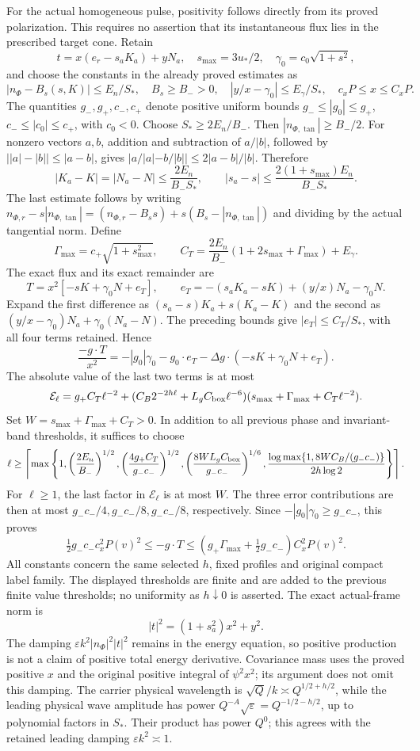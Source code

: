\documentclass[10pt,a4paper]{article}
\begin{document}
For the actual homogeneous pulse, positivity follows directly from its
proved polarization. This requires no assertion that its instantaneous
flux lies in the prescribed target cone. Retain
\[
t=x(e_r-s_aK_a)+yN_a,\quad
s_{\max}=3u_*/2,\quad \gamma_0=c_0\sqrt{1+s^2},
\]
and choose the constants in the already proved estimates as
\[
|n_\Phi-B_s(s,K)|\le E_n/S_*,\quad B_s\ge B_->0,
\quad |y/x-\gamma_0|\le E_\gamma/S_*,\quad c_xP\le x\le C_xP.
\]
The quantities \(g_-,g_+,c_-,c_+\) denote positive uniform bounds
\(g_-\le|g_0|\le g_+\), \(c_-\le|c_0|\le c_+\), with
\(c_0<0\). Choose \(S_*\ge2E_n/B_-\). Then
\(|n_{\Phi,\tan}|\ge B_-/2\). For nonzero vectors \(a,b\),
addition and subtraction of \(a/|b|\), followed by
\(\big||a|-|b|\big|\le|a-b|\), gives
\(|a/|a|-b/|b||\le2|a-b|/|b|\). Therefore
\[
|K_a-K|=|N_a-N|\le\frac{2E_n}{B_-S_*},\qquad
|s_a-s|\le\frac{2(1+s_{\max})E_n}{B_-S_*}.
\]
The last estimate follows by writing
\(n_{\Phi,r}-s|n_{\Phi,\tan}|
=(n_{\Phi,r}-B_ss)+s(B_s-|n_{\Phi,\tan}|)\)
and dividing by the actual tangential norm.
Define
\[
\Gamma_{\max}=c_+\sqrt{1+s_{\max}^2},\qquad
C_T=\frac{2E_n}{B_-}(1+2s_{\max}+\Gamma_{\max})+E_\gamma.
\]
The exact flux and its exact remainder are
\[
T=x^2[-sK+\gamma_0N+e_T],\qquad
e_T=-(s_aK_a-sK)+(y/x)N_a-\gamma_0N.
\]
Expand the first difference as
\((s_a-s)K_a+s(K_a-K)\) and the second as
\((y/x-\gamma_0)N_a+\gamma_0(N_a-N)\).
The preceding bounds give \(|e_T|\le C_T/S_*\), with all four
terms retained. Hence
\[
\frac{-g\cdot T}{x^2}=-|g_0|\gamma_0-g_0\cdot e_T
-\Delta g\cdot(-sK+\gamma_0N+e_T).
\]
The absolute value of the last two terms is at most
\[
\mathcal E_\ell=g_+C_T\ell^{-2}
+(C_B2^{-2h\ell}+L_gC_{\rm box}\ell^{-6})
(s_{\max}+\Gamma_{\max}+C_T\ell^{-2}).
\]
Set \(W=s_{\max}+\Gamma_{\max}+C_T>0\). In addition to all
previous phase and invariant-band thresholds, it suffices to choose
\[
\ell\ge\left\lceil\max\left\{
1,\left(\frac{2E_n}{B_-}\right)^{1/2},
\left(\frac{4g_+C_T}{g_-c_-}\right)^{1/2},
\left(\frac{8WL_gC_{\rm box}}{g_-c_-}\right)^{1/6},
\frac{\log\max\{1,8WC_B/(g_-c_-)\}}{2h\log2}
\right\}\right\rceil.
\]
For \(\ell\ge1\), the last factor in \(\mathcal E_\ell\) is at
most \(W\). The three error contributions are then at most
\(g_-c_-/4,g_-c_-/8,g_-c_-/8\), respectively.
Since \(-|g_0|\gamma_0\ge g_-c_-\), this proves
\[
\tfrac12g_-c_-c_x^2P(v)^2\le-g\cdot T
\le(g_+\Gamma_{\max}+\tfrac12g_-c_-)C_x^2P(v)^2.
\]
All constants concern the same selected \(h\), fixed profiles and
original compact label family. The displayed thresholds are finite and
are added to the previous finite value thresholds; no uniformity as
\(h\downarrow0\) is asserted. The exact actual-frame norm is
\[
|t|^2=(1+s_a^2)x^2+y^2.
\]
The damping \(\varepsilon k^2|n_\Phi|^2|t|^2\) remains in the
energy equation, so positive production is not a claim of positive total
energy derivative. Covariance mass uses the proved positive \(x\) and
the original positive integral of \(\psi^2x^2\); its argument does
not omit this damping. The carrier physical wavelength is \(\sqrt Q/k\asymp Q^{1/2+h/2}\), while the leading physical wave amplitude has power \(Q^{-A}\sqrt\varepsilon=Q^{-1/2-h/2}\), up to polynomial factors in \(S_*\). Their product has power \(Q^0\); this agrees with the retained leading damping \(\varepsilon k^2\asymp1\).
\end{document}
